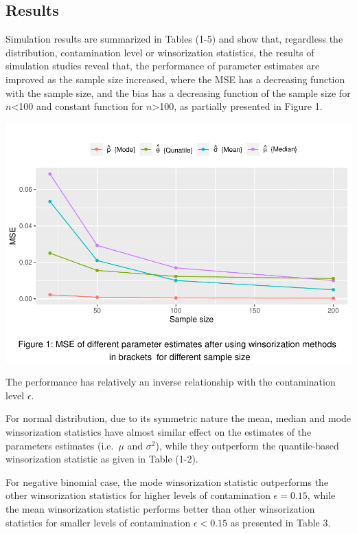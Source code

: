 \documentclass[notitlepage,12pt]{jedm}
\begin{document}
\hypertarget{results}{%
\subsection{Results}\label{results}}

Simulation results are summarized in Tables (1-5) and show that,
regardless the distribution, contamination level or winsorization
statistics, the results of simulation studies reveal that, the
performance of parameter estimates are improved as the sample size
increased, where the MSE has a decreasing function with the sample size,
and the bias has a decreasing function of the sample size for
\(n\)\textless100 and constant function for \(n\)\textgreater100, as
partially presented in Figure 1.

\includegraphics{Untitled111_files/figure-latex/unnamed-chunk-3-1.pdf}

The performance has relatively an inverse relationship with the
contamination level \(\epsilon\).

For normal distribution, due to its symmetric nature the mean, median
and mode winsorization statistics have almost similar effect on the
estimates of the parameters estimates (i.e.~\(\mu\) and \(\sigma^2\)),
while they outperform the quantile-based winsorization statistic as
given in Table (1-2).

For negative binomial case, the mode winsorization statistic outperforms
the other winsorization statistics for higher levels of contamination
\(\epsilon=0.15\), while the mean winsorization statistic performs
better than other winsorization statistics for smaller levels of
contamination \(\epsilon<0.15\) as presented in Table 3.
\end{document}

